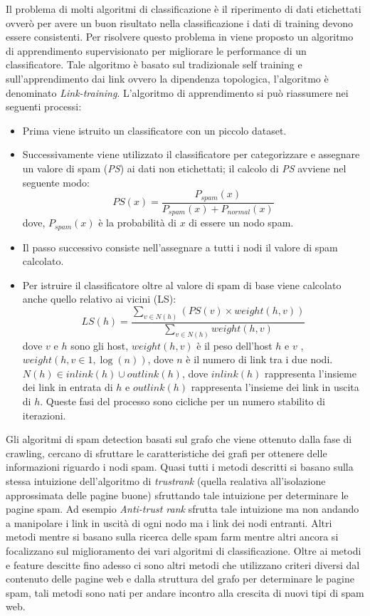 Il problema di molti algoritmi di classificazione è il riperimento di dati etichettati ovverò per avere un buon risultato nella classificazione i dati di training devono essere consistenti. Per risolvere questo problema in \cite{Geng:2009:LBS:1526709.1526920} viene proposto un algoritmo di apprendimento supervisionato per migliorare le performance di un classificatore. Tale algoritmo è basato sul tradizionale self training e sull'apprendimento dai link ovvero la dipendenza topologica, l'algoritmo è denominato \textit{Link-training}. L'algoritmo di apprendimento si può riassumere nei seguenti processi:
\begin{itemize}
 \item Prima viene istruito un classificatore con un piccolo dataset.
 \item Successivamente viene utilizzato il classificatore per categorizzare e assegnare un valore di spam (\textit{PS}) ai dati non etichettati; il calcolo di \textit{PS} avviene nel seguente modo:
 \begin{equation}
  PS(x)=\frac{P_{spam}(x)}{P_{spam}(x)+P_{normal}(x)}
 \end{equation}
 dove, \(P_{spam}(x)\) è la probabilità di \(x\) di essere un nodo spam.
 \item Il passo successivo consiste nell'assegnare a tutti i nodi il valore di spam calcolato.
 \item Per istruire il classificatore oltre al valore di spam di base viene calcolato anche quello relativo ai vicini (LS):
 \begin{equation}
LS(h)=\frac{\sum_{v\in N(h)}(PS(v)\times weight(h,v))}{\sum_{v\in N(h)}weight(h,v)}
 \end{equation}
dove \(v\) e \(h\) sono gli host, \(weight(h,v)\) è il peso dell'host \(h\) e \(v\) , \(weight(h,v\in {1,\log{(n)}})\), dove \(n\) è il numero di link tra i due nodi. \(N(h)\in inlink(h) \cup outlink(h)\), dove \(inlink(h)\) rappresenta l'insieme dei link in entrata di \(h\) e \(outlink(h)\) rappresenta l'insieme dei link in uscita di \(h\). 
Queste fasi del processo sono cicliche per un numero stabilito di iterazioni.
\end{itemize}

Gli algoritmi di spam detection basati sul grafo che viene ottenuto dalla fase di crawling, cercano di sfruttare le caratteristiche dei grafi per ottenere delle informazioni riguardo i nodi spam. Quasi tutti i metodi descritti si basano sulla stessa intuizione dell'algoritmo di \textit{trustrank} (quella realativa all'isolazione approssimata delle pagine buone) sfruttando tale intuizione per determinare le pagine spam. Ad esempio \textit{Anti-trust rank} sfrutta tale intuizione ma non andando a manipolare i link in uscità di ogni nodo ma i link dei nodi entranti. Altri metodi mentre si basano sulla ricerca delle spam farm mentre altri ancora si focalizzano sul miglioramento dei vari algoritmi di classificazione. Oltre ai metodi e feature descitte fino adesso ci sono altri metodi che utilizzano criteri diversi dal contenuto delle pagine web e dalla struttura del grafo per determinare le pagine spam, tali metodi sono nati per andare incontro alla crescita di nuovi tipi di spam web.

